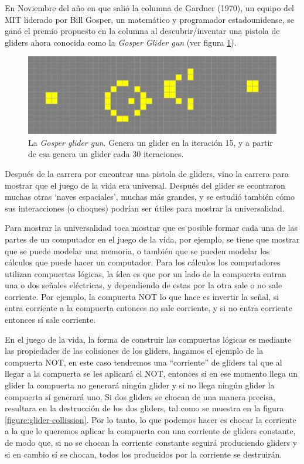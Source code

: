 En Noviembre del a\~no en que sali\'o la columna de Gardner (1970), un equipo del MIT liderado por Bill Gosper, un matem\'atico y programador estadounidense, se gan\'o el premio propuesto en la columna al descubrir/inventar una pistola de gliders ahora conocida como la \textit{Gosper Glider gun} (ver figura \ref{figure:gosper-gun}). 

\begin{figure}[h]
    \centering
    \includegraphics[width=.8\textwidth]{images/life-gosper-gun.png}
    \caption{La \textit{Gosper glider gun}. Genera un glider en la iteraci\'on 15, y a partir de esa genera un glider cada 30 iteraciones.}
    \label{figure:gosper-gun}
\end{figure}

Despu\'es de la carrera por encontrar una pistola de gliders, vino la carrera para mostrar que el juego de la vida era universal. Despu\'es del glider se econtraron muchas otras `naves espaciales', muchas m\'as grandes, y se estudi\'o tambi\'en c\'omo sus interacciones (o choques) podr\'ian ser \'utiles para mostrar la universalidad.

Para mostrar la universalidad toca mostrar que es posible formar cada una de las partes de un computador en el juego de la vida, por ejemplo, se tiene que mostrar que se puede modelar una memoria, o tambi\'en que se pueden modelar los c\'alculos que puede hacer un computador. Para los c\'alculos los computadores utilizan compuertas l\'ogicas, la \'idea es que por un lado de la compuerta entran una o dos se\~nales el\'ectricas, y dependiendo de estas por la otra sale o no sale corriente. Por ejemplo, la compuerta NOT lo que hace es invertir la se\~nal, si entra corriente a la compuerta entonces no sale corriente, y si no entra corriente entonces s\'i sale corriente.

En el juego de la vida, la forma de construir las compuertas l\'ogicas es mediante las propiedades de las colisiones de los gliders, hagamos el ejemplo de la compuerta NOT, en este caso tendremos una ``corriente'' de gliders tal que al llegar a la compuerta se les aplicar\'a el NOT, entonces si en ese momento llega un glider la compuerta no generar\'a ning\'un glider y si no llega ning\'un glider la compuerta s\'i generar\'a uno. Si dos gliders se chocan de una manera precisa, resultara en la destrucci\'on de los dos gliders, tal como se muestra en la figura \ref{figure:glider-collission}. Por lo tanto, lo que podemos hacer es chocar la corriente a la que le queremos aplicar la compuerta con una corriente de gliders constante, de modo que, si no se chocan la corriente constante seguir\'a produciendo gliders y si en cambio s\'i se chocan, todos los producidos por la corriente se destruir\'an.

